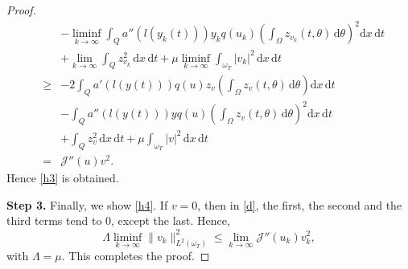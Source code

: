 \documentclass[reqno,twoside]{amsart}
\numberwithin{equation}{section}
\newtheorem{theorem}{Theorem}[section]
\theoremstyle{definition}
\numberwithin{equation}{section}
\def \dis {\displaystyle}
\def \dq {\mathrm{d}x \, \mathrm{d}t}
\def \d {\mathrm{d}}
\begin{document}
\begin{proof}
\begin{eqnarray*}
	&&\dis -\liminf_{k\to \infty}\int_{Q}a''(l(y_k(t)))y_kq(u_k)\left(\int_{\Omega}z_{v_k}(t,\theta)\,\d \theta\right)^2\dq\\
	&&\dis +\lim_{k\to \infty} \int_{Q}z^2_{v_k}\, \dq+\mu \liminf_{k\to \infty}\int_{\omega_T}|v_k|^2\, \dq\\
	&\geq&\dis -2\int_{Q}a'(l(y(t)))q(u)z_{v}\left(\int_{\Omega}z_{v}(t,\theta)\,\d \theta\right)\dq\\
	&&\dis -\int_{Q}a''(l(y(t)))yq(u)\left(\int_{\Omega}z_{v}(t,\theta)\,\d \theta\right)^2\dq\\
	&&\dis +\int_{Q}z^2_{v}\, \dq+\mu \int_{\omega_T}|v|^2\, \dq\\
	&=& \mathcal{J}''(u)v^2.
\end{eqnarray*}
Hence \eqref{h3} is obtained.

\noindent \textbf{Step 3.} Finally, we show \eqref{h4}.
If $v=0$, then in \eqref{d}, the first, the second and the third terms tend to $0$, except the last. Hence,
$$\Lambda  \liminf_{k\to \infty}\|v_k\|^2_{L^2(\omega_T)}\leq   \lim_{k\to \infty}  \mathcal{J}''(u_k)v_k^2,$$
with $\Lambda=\mu$. This completes the proof.
\end{proof}
\end{document}
